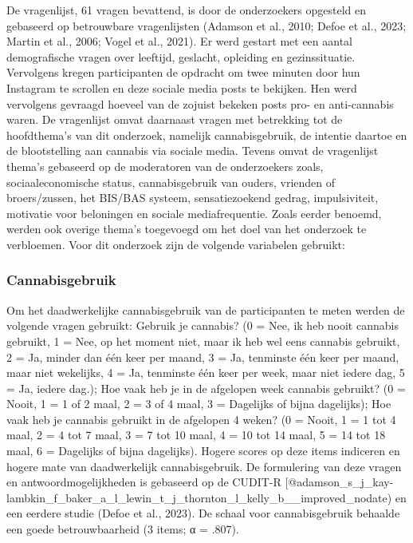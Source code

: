 \documentclass[
  letterpaper,
  DIV=11,
  numbers=noendperiod]{scrartcl}
\begin{document}
De vragenlijst, 61 vragen bevattend, is door de onderzoekers opgesteld
en gebaseerd op betrouwbare vragenlijsten (Adamson et al., 2010; Defoe
et al., 2023; Martin et al., 2006; Vogel et al., 2021). Er werd gestart
met een aantal demografische vragen over leeftijd, geslacht, opleiding
en gezinssituatie. Vervolgens kregen participanten de opdracht om twee
minuten door hun Instagram te scrollen en deze sociale media posts te
bekijken. Hen werd vervolgens gevraagd hoeveel van de zojuist bekeken
posts pro- en anti-cannabis waren. De vragenlijst omvat daarnaast vragen
met betrekking tot de hoofdthema's van dit onderzoek, namelijk
cannabisgebruik, de intentie daartoe en de blootstelling aan cannabis
via sociale media. Tevens omvat de vragenlijst thema's gebaseerd op de
moderatoren van de onderzoekers zoals, sociaaleconomische status,
cannabisgebruik van ouders, vrienden of broers/zussen, het BIS/BAS
systeem, sensatiezoekend gedrag, impulsiviteit, motivatie voor
beloningen en sociale mediafrequentie. Zoals eerder benoemd, werden ook
overige thema's toegevoegd om het doel van het onderzoek te verbloemen.
Voor dit onderzoek zijn de volgende variabelen gebruikt:

\hypertarget{cannabisgebruik-1}{%
\subsubsection{Cannabisgebruik}\label{cannabisgebruik-1}}

Om het daadwerkelijke cannabisgebruik van de participanten te meten
werden de volgende vragen gebruikt: Gebruik je cannabis? (0 = Nee, ik
heb nooit cannabis gebruikt, 1 = Nee, op het moment niet, maar ik heb
wel eens cannabis gebruikt, 2 = Ja, minder dan één keer per maand, 3 =
Ja, tenminste één keer per maand, maar niet wekelijks, 4 = Ja, tenminste
één keer per week, maar niet iedere dag, 5 = Ja, iedere dag.); Hoe vaak
heb je in de afgelopen week cannabis gebruikt? (0 = Nooit, 1 = 1 of 2
maal, 2 = 3 of 4 maal, 3 = Dagelijks of bijna dagelijks); Hoe vaak heb
je cannabis gebruikt in de afgelopen 4 weken? (0 = Nooit, 1 = 1 tot 4
maal, 2 = 4 tot 7 maal, 3 = 7 tot 10 maal, 4 = 10 tot 14 maal, 5 = 14
tot 18 maal, 6 = Dagelijks of bijna dagelijks). Hogere scores op deze
items indiceren en hogere mate van daadwerkelijk cannabisgebruik. De
formulering van deze vragen en antwoordmogelijkheden is gebaseerd op de
CUDIT-R
{[}@adamson\_s\_j\_kay-lambkin\_f\_baker\_a\_l\_lewin\_t\_j\_thornton\_l\_kelly\_b\_\_improved\_nodate)
en een eerdere studie (Defoe et al., 2023). De schaal voor
cannabisgebruik behaalde een goede betrouwbaarheid (3 items; α = .807).
\end{document}
